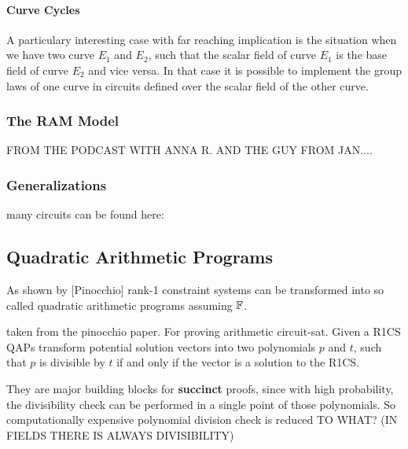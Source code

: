 \paragraph{Curve Cycles} A particulary interesting case with far reaching implication is the situation when we have two curve $E_1$ and $E_2$, such that the scalar field of curve $E_1$ is the base field of curve $E_2$ and vice versa. In that case it is possible to implement the group laws of one curve in circuits defined over the scalar field of the other curve. 

\subsubsection{The RAM Model}
FROM THE PODCAST WITH ANNA R. AND THE GUY FROM JAN....


\subsubsection{Generalizations}
many circuits can be found here:

\subsection{Quadratic Arithmetic Programs}
As shown by [Pinocchio] rank-1 constraint systems can be transformed into so called quadratic  arithmetic  programs  assuming $\mathbb{F}$.

taken from the pinocchio paper. For proving arithmetic circuit-sat.  Given a R1CS QAPs transform potential solution vectors into two polynomials $p$ and $t$, such that $p$ is divisible by $t$ if and only if the vector is a solution to the R1CS. 

They are major building blocks for \textbf{succinct} proofs, since with high probability, the divisibility check can be performed in a single point of those polynomials. So computationally expensive polynomial division check is reduced TO WHAT? (IN FIELDS THERE IS ALWAYS DIVISIBILITY) 

